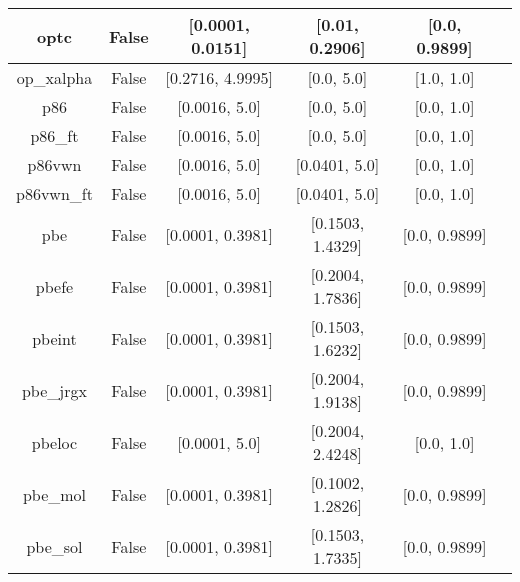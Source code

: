 \begin{tabular}{|c|c|c|c|c|l|}
          optc &                 False & [0.0001, 0.0151] &   [0.01, 0.2906] &    [0.0, 0.9899] &                                           \cite{Cohen2001_607} \\ \hline
    op\_xalpha &                 False & [0.2716, 4.9995] &       [0.0, 5.0] &       [1.0, 1.0] &                      \cite{Tsuneda1999_10664,Tsuneda1999_5656} \\ \hline
           p86 &                 False &    [0.0016, 5.0] &       [0.0, 5.0] &       [0.0, 1.0] &                                         \cite{Perdew1986_8822} \\ \hline
       p86\_ft &                 False &    [0.0016, 5.0] &       [0.0, 5.0] &       [0.0, 1.0] &                                         \cite{Perdew1986_8822} \\ \hline
        p86vwn &                 False &    [0.0016, 5.0] &    [0.0401, 5.0] &       [0.0, 1.0] &                                         \cite{Perdew1986_8822} \\ \hline
    p86vwn\_ft &                 False &    [0.0016, 5.0] &    [0.0401, 5.0] &       [0.0, 1.0] &                                         \cite{Perdew1986_8822} \\ \hline
           pbe &                 False & [0.0001, 0.3981] & [0.1503, 1.4329] &    [0.0, 0.9899] &                     \cite{Perdew1996_3865,Perdew1996_3865_err} \\ \hline
         pbefe &                 False & [0.0001, 0.3981] & [0.2004, 1.7836] &    [0.0, 0.9899] &                                          \cite{Perez2015_3844} \\ \hline
        pbeint &                 False & [0.0001, 0.3981] & [0.1503, 1.6232] &    [0.0, 0.9899] &                                      \cite{Fabiano2010_113104} \\ \hline
     pbe\_jrgx &                 False & [0.0001, 0.3981] & [0.2004, 1.9138] &    [0.0, 0.9899] &                                      \cite{Pedroza2009_201106} \\ \hline
        pbeloc &                 False &    [0.0001, 5.0] & [0.2004, 2.4248] &       [0.0, 1.0] &                                   \cite{Constantin2012_035130} \\ \hline
      pbe\_mol &                 False & [0.0001, 0.3981] & [0.1002, 1.2826] &    [0.0, 0.9899] &                                     \cite{delCampo2012_104108} \\ \hline
      pbe\_sol &                 False & [0.0001, 0.3981] & [0.1503, 1.7335] &    [0.0, 0.9899] &                                       \cite{Perdew2008_136406} \\ \hline

\end{tabular}
